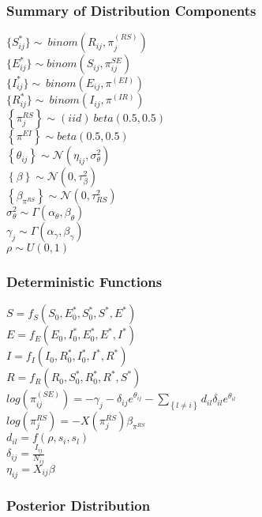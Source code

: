 \documentclass[12pt]{article}
\newcommand \noi {\noindent}
\newcommand \mbreak {\\ \vspace{0.1in}}
\begin{document}
\subsubsection{Summary of Distribution Components}
$\{S_{ij}^*\} \sim\  binom(R_{ij}, \pi_j^{(RS)})$\mbreak
$\{E_{ij}^*\} \sim binom(S_{ij}, \pi^{SE}_{ij})$ \mbreak
$\{I_{ij}^*\} \sim\  binom(E_{ij}, \pi^{(EI)})$\mbreak
$\{R_{ij}^*\} \sim\  binom(I_{ij}, \pi^{(IR)})$\mbreak
\noi
$\left\{\pi_j^{RS}  \right\} \sim (iid)\ beta(0.5, 0.5)$\mbreak 
$\left\{\pi^{EI}  \right\} \sim beta(0.5, 0.5)$\mbreak 
$\left\{ \theta_{ij}\right\} \sim \mathcal{N}(\eta_{ij}, \sigma^2_{\theta})$ \mbreak
$\left\{ \beta \right\} \sim \mathcal{N}(0, \tau^2_\beta) $\mbreak 
$\left\{ \beta_{\pi^{RS}} \right\} \sim \mathcal{N}(0, \tau^2_{RS}) $\mbreak 
$\sigma^2_{\theta} \sim \Gamma(\alpha_\theta, \beta_\theta)$\mbreak
$\gamma_j \sim \Gamma(\alpha_\gamma, \beta_\gamma)$\mbreak
$\rho \sim U(0,1)$

\subsubsection{Deterministic Functions}
$S = f_S(S_0, E^*_0, S^*_0, S^*, E^*)$ \mbreak
$E = f_E(E_0, I^*_0, E^*_0, E^*, I^*)$ \mbreak
$I = f_I(I_0, R^*_0, I^*_0, I^*, R^*)$ \mbreak
$R = f_R(R_0, S^*_0, R^*_0, R^*, S^*)$ \mbreak
$\displaystyle log(\pi^{(SE)}_{ij}) = -\gamma_j-\delta_{ij}e^{\theta_{ij}} - \sum_{\left\{ l \ne i \right\}}d_{il}\delta_{il}e^{\theta_{il}}$\mbreak
$log(\pi_j^{RS}) = -X(\pi_j^{RS}) \beta_{\pi^{RS}}$\mbreak
$d_{il} = f(\rho, s_i, s_l)$\mbreak
$\delta_{ij} = \frac{I_{ij}}{N_{ij}}$ \mbreak
$\eta_{ij} = X_{ij}\beta$
\subsubsection{Posterior Distribution}
\end{document}

